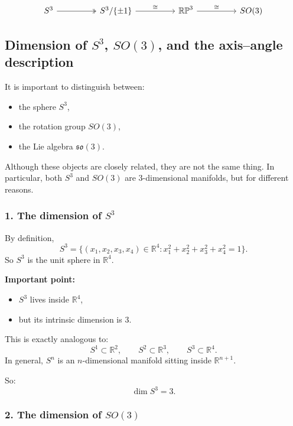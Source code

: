 \documentclass[12pt,a4paper]{article}
\theoremstyle{notespace}
\begin{document}
\[
\begin{tikzcd}[column sep=huge]
	S^3 \arrow[r, two heads] & S^3/\{\pm1\} \arrow[r, "\cong"] & \mathbb{RP}^3 \arrow[r, "\cong"] & SO(3)
\end{tikzcd}
\]

\subsection{\texorpdfstring{Dimension of \(S^3\), \(SO(3)\), and the axis--angle description}{Dimension of S3, SO(3), and the axis-angle description}}

It is important to distinguish between:

\begin{itemize}
	\item the sphere \(S^3\),
	\item the rotation group \(SO(3)\),
	\item the Lie algebra \(\mathfrak{so}(3)\).
\end{itemize}

Although these objects are closely related, they are not the same thing.  
In particular, both \(S^3\) and \(SO(3)\) are \(3\)-dimensional manifolds, but for different reasons.

\subsubsection*{1. The dimension of \texorpdfstring{\(S^3\)}{S3}}

By definition,
\[
S^3=\{(x_1,x_2,x_3,x_4)\in \mathbb R^4 : x_1^2+x_2^2+x_3^2+x_4^2=1\}.
\]
So \(S^3\) is the unit sphere in \(\mathbb R^4\).

\medskip

\textbf{Important point:}
\begin{itemize}
	\item \(S^3\) lives inside \(\mathbb R^4\),
	\item but its intrinsic dimension is \(3\).
\end{itemize}

This is exactly analogous to:
\[
S^1\subset \mathbb R^2,\qquad S^2\subset \mathbb R^3,\qquad S^3\subset \mathbb R^4.
\]
In general, \(S^n\) is an \(n\)-dimensional manifold sitting inside \(\mathbb R^{n+1}\).

So:
\[
\boxed{\dim S^3=3.}
\]

\subsubsection*{2. The dimension of \texorpdfstring{\(SO(3)\)}{SO(3)}}
\end{document}
